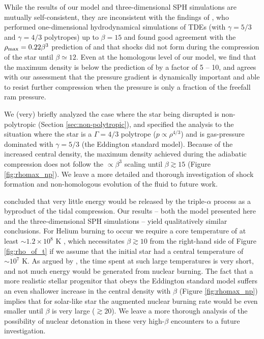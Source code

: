 \documentclass[twocolumn]{aastex62}
\begin{document}
While the results of our model and three-dimensional SPH simulations are mutually self-consistent, they are inconsistent with the findings of \citet{brassart08}, who performed one-dimensional hydrodynamical simulations of TDEs (with $\gamma = 5/3$ and $\gamma = 4/3$ polytropes) up to $\beta = 15$ and found good agreement with the $\rho_{\rm max} = 0.22 \beta^3$ prediction of \citet{luminet86} and that shocks did not form during the compression of the star until $\beta \simeq 12$. Even at the homologous level of our model, we find that the maximum density is below the prediction of \citet{luminet86} by a factor of 5 -- 10, and agrees with our assessment that the pressure gradient is dynamically important and able to resist further compression when the pressure is only a fraction of the freefall ram pressure. %

We (very) briefly analyzed the case where the star being disrupted is non-polytropic (Section \ref{sec:non-polytropic}), and specified the analysis to the situation where the star is a $\Gamma = 4/3$ polytrope ($p \propto \rho^{4/3}$) and is gas-pressure dominated with $\gamma = 5/3$ (the Eddington standard model). Because of the increased central density, the maximum density achieved during the adiabatic compression does not follow the $\propto \beta^3$ scaling until $\beta \gtrsim 15$ (Figure \ref{fig:rhomax_np}). We leave a more detailed and thorough investigation of shock formation and non-homologous evolution of the fluid to future work.

\citet{Bicknell:1983aa} concluded that very little energy would be released by the triple-$\alpha$ process as a byproduct of the tidal compression. Our results -- both the model presented here and the three-dimensional SPH simulations -- yield qualitatively similar conclusions. For Helium burning to occur we require a core temperature of at least $\sim 1.2\times 10^{8}$ K \citep{hansen04}, which necessitates $\beta \gtrsim 10$ from the right-hand side of Figure \ref{fig:rho_of_t} if we assume that the initial star had a central temperature of $\sim 10^{7}$ K. As argued by \citet{Bicknell:1983aa}, the time spent at such large temperatures is very short, and not much energy would be generated from nuclear burning. The fact that a more realistic stellar progenitor that obeys the Eddington standard model suffers an even shallower increase in the central density with $\beta$ (Figure \ref{fig:rhomax_np}) implies that for solar-like star the augmented nuclear burning rate would be even smaller until $\beta$ is very large ($\gtrsim 20$). We leave a more thorough analysis of the possibility of nuclear detonation in these very high-$\beta$ encounters to a future investigation.
\end{document}
